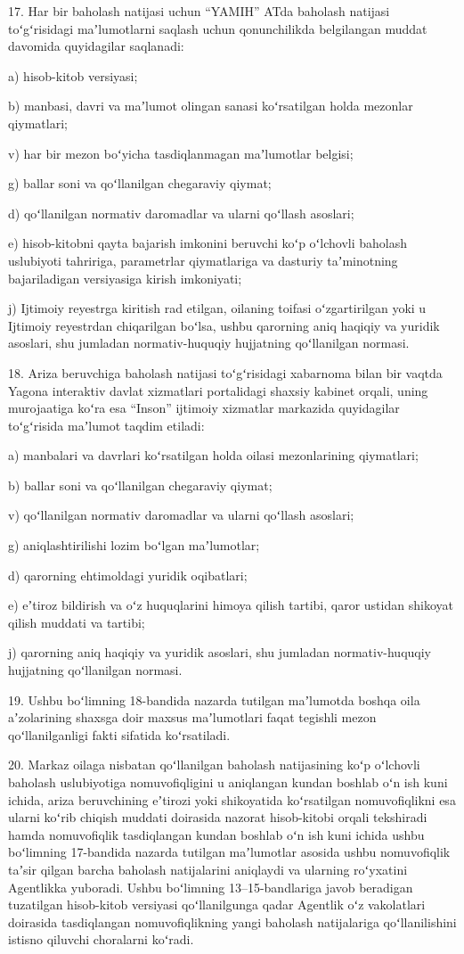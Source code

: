 \documentclass[14pt,a4paper]{extarticle}
\newcommand{\norm}[1]{\par\noindent\hspace*{1.27cm}#1. }
\newcommand{\sub}[1]{\par\noindent\hspace*{1.27cm}#1 }
\begin{document}
\norm{17}Har bir baholash natijasi uchun “YAMIH” ATda baholash natijasi toʻgʻrisidagi maʼlumotlarni saqlash uchun qonunchilikda belgilangan muddat davomida quyidagilar saqlanadi:
\sub{a)}hisob-kitob versiyasi;
\sub{b)}manbasi, davri va maʼlumot olingan sanasi koʻrsatilgan holda mezonlar qiymatlari;
\sub{v)}har bir mezon boʻyicha tasdiqlanmagan maʼlumotlar belgisi;
\sub{g)}ballar soni va qoʻllanilgan chegaraviy qiymat;
\sub{d)}qoʻllanilgan normativ daromadlar va ularni qoʻllash asoslari;
\sub{e)}hisob-kitobni qayta bajarish imkonini beruvchi koʻp oʻlchovli baholash uslubiyoti tahririga, parametrlar qiymatlariga va dasturiy taʼminotning bajariladigan versiyasiga kirish imkoniyati;
\sub{j)}Ijtimoiy reyestrga kiritish rad etilgan, oilaning toifasi oʻzgartirilgan yoki u Ijtimoiy reyestrdan chiqarilgan boʻlsa, ushbu qarorning aniq haqiqiy va yuridik asoslari, shu jumladan normativ-huquqiy hujjatning qoʻllanilgan normasi.

\norm{18}Ariza beruvchiga baholash natijasi toʻgʻrisidagi xabarnoma bilan bir vaqtda Yagona interaktiv davlat xizmatlari portalidagi shaxsiy kabinet orqali, uning murojaatiga koʻra esa “Inson” ijtimoiy xizmatlar markazida quyidagilar toʻgʻrisida maʼlumot taqdim etiladi:
\sub{a)}manbalari va davrlari koʻrsatilgan holda oilasi mezonlarining qiymatlari;
\sub{b)}ballar soni va qoʻllanilgan chegaraviy qiymat;
\sub{v)}qoʻllanilgan normativ daromadlar va ularni qoʻllash asoslari;
\sub{g)}aniqlashtirilishi lozim boʻlgan maʼlumotlar;
\sub{d)}qarorning ehtimoldagi yuridik oqibatlari;
\sub{e)}eʼtiroz bildirish va oʻz huquqlarini himoya qilish tartibi, qaror ustidan shikoyat qilish muddati va tartibi;
\sub{j)}qarorning aniq haqiqiy va yuridik asoslari, shu jumladan normativ-huquqiy hujjatning qoʻllanilgan normasi.

\norm{19}Ushbu boʻlimning 18-bandida nazarda tutilgan maʼlumotda boshqa oila aʼzolarining shaxsga doir maxsus maʼlumotlari faqat tegishli mezon qoʻllanilganligi fakti sifatida koʻrsatiladi.

\norm{20}Markaz oilaga nisbatan qoʻllanilgan baholash natijasining koʻp oʻlchovli baholash uslubiyotiga nomuvofiqligini u aniqlangan kundan boshlab oʻn ish kuni ichida, ariza beruvchining eʼtirozi yoki shikoyatida koʻrsatilgan nomuvofiqlikni esa ularni koʻrib chiqish muddati doirasida nazorat hisob-kitobi orqali tekshiradi hamda nomuvofiqlik tasdiqlangan kundan boshlab oʻn ish kuni ichida ushbu boʻlimning 17-bandida nazarda tutilgan maʼlumotlar asosida ushbu nomuvofiqlik taʼsir qilgan barcha baholash natijalarini aniqlaydi va ularning roʻyxatini Agentlikka yuboradi. Ushbu boʻlimning 13–15-bandlariga javob beradigan tuzatilgan hisob-kitob versiyasi qoʻllanilgunga qadar Agentlik oʻz vakolatlari doirasida tasdiqlangan nomuvofiqlikning yangi baholash natijalariga qoʻllanilishini istisno qiluvchi choralarni koʻradi.
\end{document}
